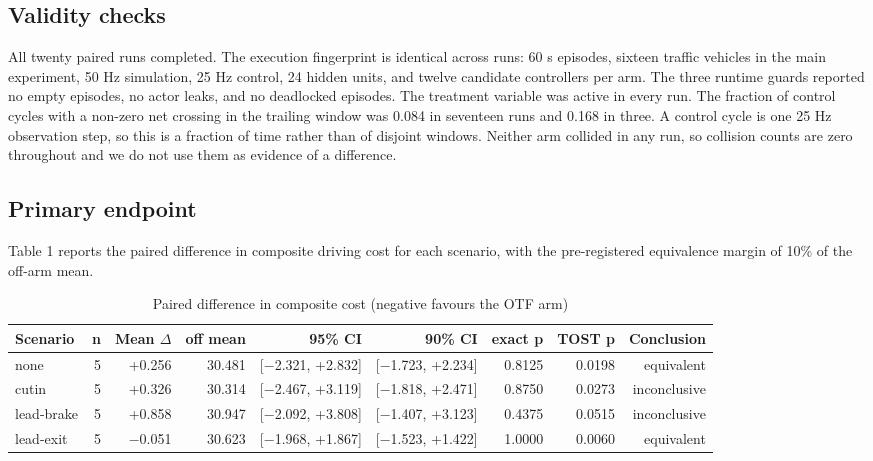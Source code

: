 \documentclass[journal]{IEEEtran}
\begin{document}
\subsection{Validity checks}
All twenty paired runs completed. The execution fingerprint is identical across runs: 60 s episodes,
sixteen traffic vehicles in the main experiment, 50 Hz simulation, 25 Hz control, 24 hidden units, and
twelve candidate controllers per arm. The three runtime guards reported no empty episodes, no actor
leaks, and no deadlocked episodes.
The treatment variable was active in every run. The fraction of control cycles with a non-zero net
crossing in the trailing window was 0.084 in seventeen runs and 0.168 in three. A control cycle is
one 25 Hz observation step, so this is a fraction of time rather than of disjoint windows. Neither arm collided in any run, so collision counts are zero
throughout and we do not use them as evidence of a difference.
\subsection{Primary endpoint}
Table 1 reports the paired difference in composite driving cost for each scenario, with the
pre-registered equivalence margin of 10\% of the off-arm mean.
\begin{table}[!t]
\centering
\small
\caption{Paired difference in composite cost (negative favours the OTF arm)}
\begin{tabular}{lrrrrrrrr}
\hline
Scenario & n & Mean $\Delta$ & off mean & 95\% CI & 90\% CI & exact p & TOST p & Conclusion \\
\hline
none & 5 & +0.256 & 30.481 & [$-$2.321, +2.832] & [$-$1.723, +2.234] & 0.8125 & 0.0198 & equivalent \\
cutin & 5 & +0.326 & 30.314 & [$-$2.467, +3.119] & [$-$1.818, +2.471] & 0.8750 & 0.0273 & inconclusive \\
lead-brake & 5 & +0.858 & 30.947 & [$-$2.092, +3.808] & [$-$1.407, +3.123] & 0.4375 & 0.0515 & inconclusive \\
lead-exit & 5 & $-$0.051 & 30.623 & [$-$1.968, +1.867] & [$-$1.523, +1.422] & 1.0000 & 0.0060 & equivalent \\
\hline
\end{tabular}
\end{table}
\end{document}
